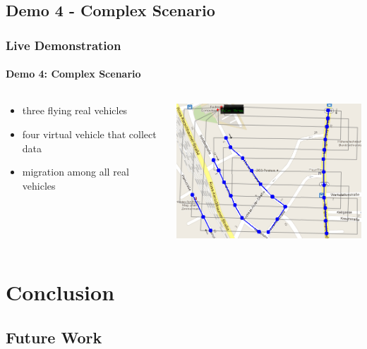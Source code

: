 \documentclass{beamer}
\begin{document}
\subsection{Demo 4 - Complex Scenario}

\begin{frame}\frametitle{Live Demonstration}\framesubtitle{Demo 4: Complex Scenario}
	\begin{columns}
		\begin{column}{5cm}
		\begin{itemize}
			\item three flying real vehicles
			\item four virtual vehicle that collect data
			\item migration among all real vehicles
		\end{itemize}
		\end{column}
		\begin{column}{8cm}
		\begin{center}
			{\includegraphics[width=7.7cm]{demo4.png}}
		\end{center}
		\end{column}
	\end{columns}
\end{frame}

\section{Conclusion}

\subsection{Future Work}
\end{document}
